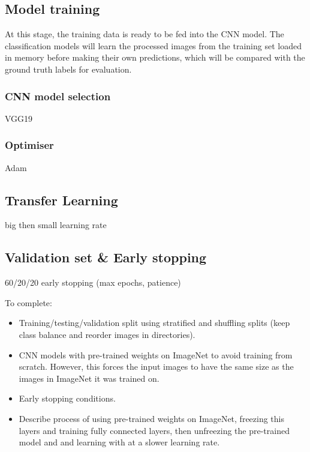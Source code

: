 


\subsection{Model training}

At this stage, the training data is ready to be fed into the CNN model. The classification models will learn the processed images from the training set loaded in memory before making their own predictions, which will be compared with the ground truth labels for evaluation.

\subsubsection{CNN model selection}

VGG19

\subsubsection{Optimiser}

Adam

\subsection{Transfer Learning}

big then small learning rate

\subsection{Validation set \& Early stopping}

60/20/20
early stopping (max epochs, patience)

To complete:
\begin{itemize}
    \item Training/testing/validation split using stratified and shuffling splits (keep class balance and reorder images in directories).
    \item CNN models with pre-trained weights on ImageNet to avoid training from scratch. However, this  forces the input images to have the same size as the images in ImageNet it was trained on.
    \item Early stopping conditions.
    \item Describe process of using pre-trained weights on ImageNet, freezing this layers and training fully connected layers, then unfreezing the pre-trained model and and learning with at a slower learning rate.
\end{itemize}

